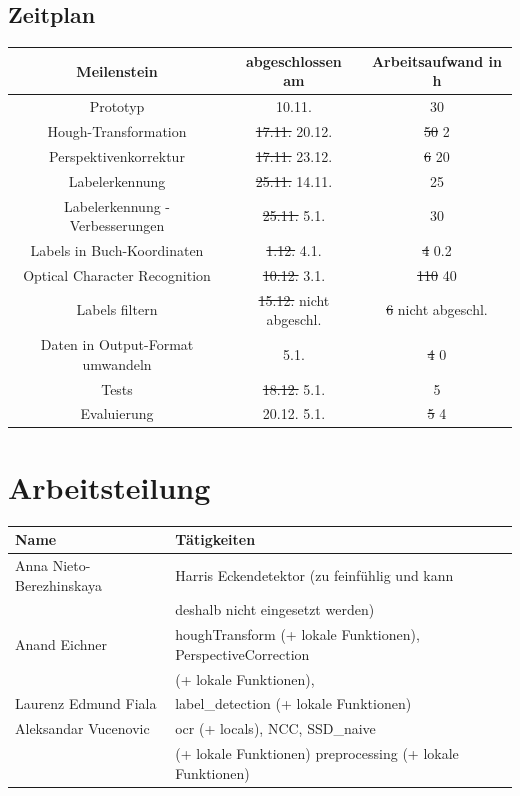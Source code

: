 \documentclass[paper=A4, deutsch]{scrartcl}
\begin{document}
\subsection{Zeitplan}
\begin{table}[H]
	\centering
		\begin{tabular}{|c|c|c|}
		\hline
		Meilenstein & abgeschlossen am & Arbeitsaufwand in h\\
		\hline
		Prototyp & 10.11. & 30\\
		\hline
		Hough-Transformation & \st{17.11.} 20.12. & \st{50} 2\\
		\hline
		Perspektivenkorrektur & \st{17.11.} 23.12. & \st{6} 20\\
		\hline
		Labelerkennung & \st{25.11.} 14.11. & 25\\
		\hline
		Labelerkennung - Verbesserungen & \st{25.11.} 5.1. & 30\\
		\hline
		Labels in Buch-Koordinaten & \st{1.12.} 4.1. & \st{4} 0.2\\
		\hline
		Optical Character Recognition & \st{10.12.} 3.1. & \st{110} 40\\
		\hline
		Labels filtern & \st{15.12.} nicht abgeschl. & \st{6} nicht abgeschl.\\
		\hline
		Daten in Output-Format umwandeln & 5.1. & \st{4} 0\\
		\hline
		Tests & \st{18.12.} 5.1. & 5\\
		\hline
		Evaluierung & {20.12.} 5.1. & \st{5} 4 \\
		\hline
		\end{tabular}
\end{table}

\section{Arbeitsteilung}
\begin{center}
  \begin{tabular}{ |l | l | }
    \hline
  Name & Tätigkeiten\\
    \hline
    	Anna Nieto-Berezhinskaya & Harris Eckendetektor (zu feinfühlig und kann\\
    	&deshalb nicht eingesetzt werden)\\
		\hline
		Anand Eichner & houghTransform (+ lokale Funktionen), PerspectiveCorrection\\
		&(+ lokale Funktionen),\\
		\hline
		Laurenz Edmund Fiala & label\_detection (+ lokale Funktionen)\\
		\hline
		Aleksandar Vucenovic & ocr (+ locals), NCC, SSD\_naive\\
		& (+ lokale Funktionen) preprocessing (+ lokale Funktionen)\\
		\hline
  \end{tabular}
\end{center}
\end{document}
